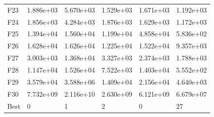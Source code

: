 \begin{tabular}{llllll}
F23  &  1.886e+03 &  5.670e+03 &  1.529e+03 &  1.671e+03 &  1.192e+03 \\
F24  &  1.856e+03 &  4.284e+03 &  1.876e+03 &  1.629e+03 &  1.172e+03 \\
F25  &  1.394e+04 &  1.560e+04 &  1.199e+04 &  4.858e+04 &  5.836e+02 \\
F26  &  1.628e+04 &  1.626e+04 &  1.225e+04 &  1.522e+04 &  9.357e+03 \\
F27  &  3.003e+03 &  1.368e+04 &  3.327e+03 &  2.374e+03 &  1.788e+03 \\
F28  &  1.147e+04 &  1.526e+04 &  7.522e+03 &  1.403e+04 &  5.552e+02 \\
F29  &  3.579e+04 &  3.588e+06 &  1.409e+04 &  2.156e+04 &  4.640e+03 \\
F30  &  7.732e+09 &  2.116e+10 &  2.630e+09 &  6.121e+09 &  6.679e+07 \\
Best &          0 &          1 &          2 &          0 &         27 \\
\bottomrule
\end{tabular}

